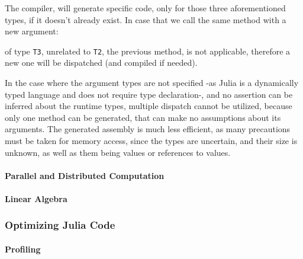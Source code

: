 \documentclass[11pt,a4paper,english,greek,twoside]{thesis}
\begin{document}
The compiler, will generate specific code, only for those three
aforementioned types, if it doesn't already exist. In case that we call
the same method with a new argument:

\begin{Shaded}
\begin{Highlighting}[]
\end{Highlighting}
\end{Shaded}

of type \texttt{T3}, unrelated to \texttt{T2}, the previous method, is
not applicable, therefore a new one will be dispatched (and compiled if
needed).

In the case where the argument types are not specified -as Julia is a
dynamically typed language and does not require type declaration-, and
no assertion can be inferred about the runtime types, multiple dispatch
cannot be utilized, because only one method can be generated, that can
make no assumptions about its arguments. The generated assembly is much
less efficient, as many precautions must be taken for memory access,
since the types are uncertain, and their size is unknown, as well as
them being values or references to values.

\paragraph{Parallel and Distributed
Computation}\label{parallel-and-distributed-computation}

\paragraph{Linear Algebra}\label{linear-algebra}

\subsubsection{Optimizing Julia Code}\label{optimizing-julia-code}

\paragraph{Profiling}\label{profiling}
	\pagebreak
	\pagestyle{empty}
\end{document}
